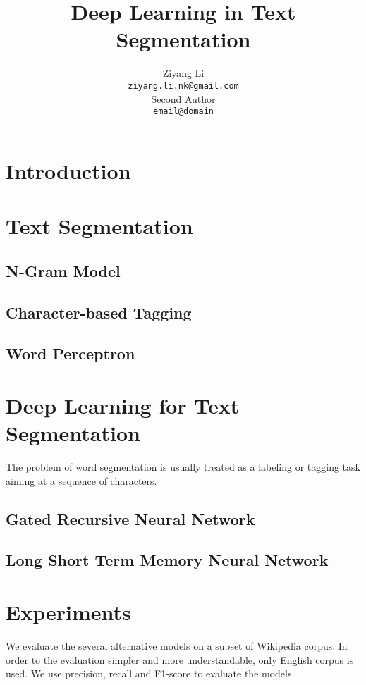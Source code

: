 \documentclass[11pt]{article}
\title{Deep Learning in Text Segmentation}
\author{Ziyang Li \\
  {\tt ziyang.li.nk@gmail.com} \\\And
  Second Author \\
  {\tt email@domain} \\}
\date{}
\begin{document}
\maketitle
\begin{abstract}
\end{abstract}

\section{Introduction}

\section{Text Segmentation}

\subsection{N-Gram Model}

\subsection{Character-based Tagging}

\subsection{Word Perceptron}

\section{Deep Learning for Text Segmentation}
The problem of word segmentation is usually treated as a labeling or tagging task aiming at a sequence of characters. 


\subsection{Gated Recursive Neural Network}

\subsection{Long Short Term Memory Neural Network}

\section{Experiments}
We evaluate the several alternative models on a subset of Wikipedia corpus. In order to the evaluation simpler and more understandable, only English corpus is used. We use precision, recall and F1-score to evaluate the models.
\end{document}
